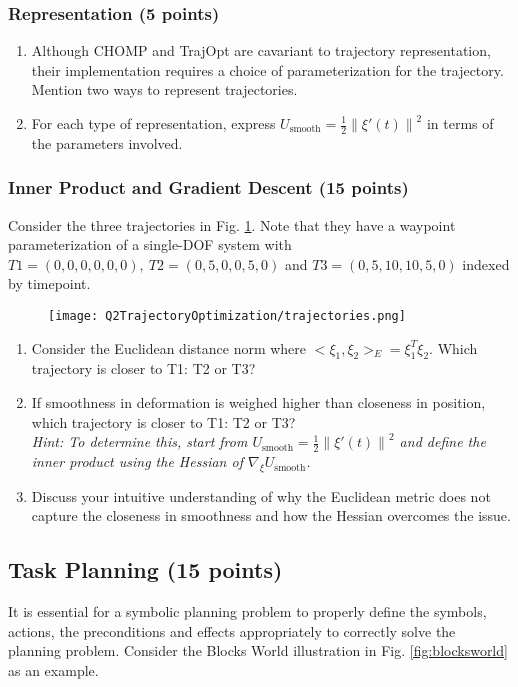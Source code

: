 \documentclass{article}
\newcommand{\?}{\stackrel{?}{=}}
\begin{document}
\subsubsection{Representation (5 points)}
\begin{enumerate}
	\item Although CHOMP and TrajOpt are cavariant to trajectory representation, their implementation requires a choice of parameterization for the trajectory. Mention two ways to represent trajectories.
	\item For each type of representation, express $U_{\text{smooth}}=\frac{1}{2}\left\lVert\xi'(t)\right\rVert^2$ in terms of the parameters involved.
\end{enumerate}
\subsubsection{Inner Product and Gradient Descent (15 points)}
Consider the three trajectories in Fig. \ref{fig:trajectories}. Note that they have a waypoint parameterization of a single-DOF system with $T1 = (0, 0, 0, 0, 0, 0),~T2 = (0, 5, 0, 0, 5, 0)$ and $T3 = (0, 5, 10, 10, 5, 0)$ indexed by timepoint.

\begin{figure}[!h]
	\centering
	\texttt{[image: Q2TrajectoryOptimization/trajectories.png]}
	\caption{}
	\label{fig:trajectories}
\end{figure}

\begin{enumerate}
	\item Consider the Euclidean distance norm where $<\xi_1, \xi_2>_E = \xi_1^T\xi_2$. Which trajectory is closer to T1: T2 or T3?
	\item If smoothness in deformation is weighed higher than closeness in position, which trajectory is closer to T1: T2 or T3? \\
	\emph{Hint: To determine this, start from $U_{\text{smooth}}=\frac{1}{2}\left\lVert\xi'(t)\right\rVert^2$ and define the inner product using the Hessian of $\nabla_\xi U_\text{smooth}$.}
	\item Discuss your intuitive understanding of why the Euclidean metric does not capture the closeness in smoothness and how the Hessian overcomes the issue.
\end{enumerate}

\subsection{Task Planning (15 points)}
It is essential for a symbolic planning problem to properly define the symbols, actions, the preconditions and effects appropriately to correctly solve the planning problem. Consider the Blocks World illustration in Fig. \ref{fig:blocksworld} as an example.
\end{document}

